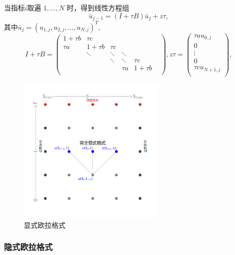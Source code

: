 \documentclass{article}
\begin{document}
当指标$i$取遍 $1,...,N$ 时，得到线性方程组$$\bar{u}_{j-1} = (I + \tau B)\bar{u}_{j} + z\tau,$$
其中$\bar{u}_{j} = (u_{1, j}, u_{2, j},...,u_{N, j})^T,$
$$
I + \tau B = \begin{pmatrix}
                1 +\tau b  &   \tau c     &            &            &            & \\
                \tau a     &   1 +\tau b  &   \tau c   &            &            & \\
                           &   \ddots     &   \ddots   &   \ddots   &            & \\
                           &              &   \ddots   &   \ddots   &  \tau c    & \\
                           &              &            &   \tau a   &  1 +\tau b & \\
            \end{pmatrix},
z\tau = \begin{pmatrix}
            \tau au_{0, j}   \\
            0                \\
            \vdots           \\
            0                \\
            \tau cu_{N+1, j} \\
        \end{pmatrix},
$$

\begin{figure}[H]
  \centering
  \includegraphics[width=0.64\textwidth,height=0.64\textwidth]{Images/2_ExpEu.png}
  \caption{显式欧拉格式}
  \label{fig:2_ExpEu}
\end{figure} 


\subsubsection{隐式欧拉格式}
\end{document}
